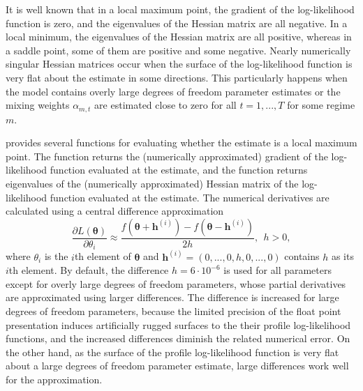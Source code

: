 \documentclass[nojss]{jss}
\begin{document}
It is well known that in a local maximum point, the gradient of the log-likelihood function is zero, and the eigenvalues of the Hessian matrix are all negative. In a local minimum, the eigenvalues of the Hessian matrix are all positive, whereas in a saddle point, some of them are positive and some negative. Nearly numerically singular Hessian matrices occur when the surface of the log-likelihood function is very flat about the estimate in some directions. This particularly happens when the model contains overly large degrees of freedom parameter estimates or the mixing weights $\alpha_{m,t}$ are estimated close to zero for all $t=1,...,T$ for some regime $m$.

 provides several functions for evaluating whether the estimate is a local maximum point. The function  returns the (numerically approximated) gradient of the log-likelihood function evaluated at the estimate, and the function  returns eigenvalues of the (numerically approximated) Hessian matrix of the log-likelihood function evaluated at the estimate. The numerical derivatives are calculated using a central difference approximation
\begin{equation}
\frac{\partial L(\boldsymbol{\theta})}{\partial \theta_i} \approx \frac{f(\boldsymbol{\theta} + \boldsymbol{h}^{(i)}) - f(\boldsymbol{\theta} - \boldsymbol{h}^{(i)})}{2h}, \ \ h>0,
\end{equation}
where $\theta_i$ is the $i$th element of $\boldsymbol{\theta}$ and $\boldsymbol{h}^{(i)}=(0,...,0,h,0,...,0)$
contains $h$ as its $i$th element. By default, the difference $h=6\cdot 10^{-6}$ is used for all parameters except for overly large degrees of freedom parameters, whose partial derivatives are approximated using larger differences. The difference is increased for large degrees of freedom parameters, because the limited precision of the float point presentation induces artificially rugged surfaces to the their profile log-likelihood functions, and the increased differences diminish the related numerical error. On the other hand, as the surface of the profile log-likelihood function is very flat about a large degrees of freedom parameter estimate, large differences work well for the approximation.
\end{document}
